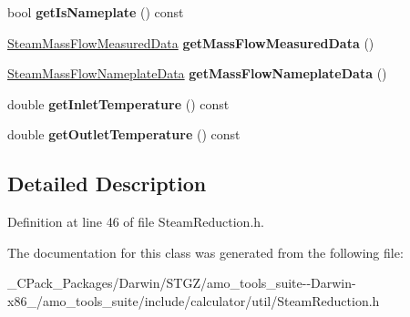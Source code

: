 \begin{DoxyCompactItemize}
\item 
\mbox{\label{class_steam_mass_flow_method_data_adfbfa5ce4fa4d7ea0d35b2a60d6d117a}} 
bool {\bfseries get\+Is\+Nameplate} () const
\item 
\mbox{\label{class_steam_mass_flow_method_data_a5cd24d82a93883a7736dfed6faf6e8d8}} 
\hyperlink{class_steam_mass_flow_measured_data}{Steam\+Mass\+Flow\+Measured\+Data} {\bfseries get\+Mass\+Flow\+Measured\+Data} ()
\item 
\mbox{\label{class_steam_mass_flow_method_data_afd8082bfcb1d701c7b0da01457b97a88}} 
\hyperlink{class_steam_mass_flow_nameplate_data}{Steam\+Mass\+Flow\+Nameplate\+Data} {\bfseries get\+Mass\+Flow\+Nameplate\+Data} ()
\item 
\mbox{\label{class_steam_mass_flow_method_data_a4029950bd73f51a58b7ff42a6b6814e9}} 
double {\bfseries get\+Inlet\+Temperature} () const
\item 
\mbox{\label{class_steam_mass_flow_method_data_a6fb7efd7f7195fd63e0a23e83ebfdcea}} 
double {\bfseries get\+Outlet\+Temperature} () const
\end{DoxyCompactItemize}


\subsection{Detailed Description}


Definition at line 46 of file Steam\+Reduction.\+h.



The documentation for this class was generated from the following file\+:\begin{DoxyCompactItemize}
\item 
\+\_\+\+C\+Pack\+\_\+\+Packages/\+Darwin/\+S\+T\+G\+Z/amo\+\_\+tools\+\_\+suite-\/-\/\+Darwin-\/x86\+\_/amo\+\_\+tools\+\_\+suite/include/calculator/util/Steam\+Reduction.\+h\end{DoxyCompactItemize}
